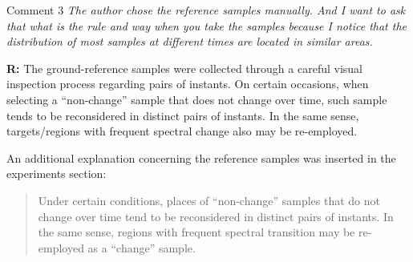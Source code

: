 \documentclass[11pt]{report}
\begin{document}
\medskip
\begin{mybox}{Comment 3}
\textit{The author chose the reference samples manually. And I want to ask that what is the rule and way when you take the samples because I notice that the distribution of most samples at different times are located in similar areas.}

\medskip

\textbf{R:} The ground-reference samples were collected through a careful visual inspection process regarding pairs of instants. On certain occasions, when selecting a ``non-change'' sample that does not change over time, such sample tends to be reconsidered in distinct pairs of instants. In the same sense, targets/regions with frequent spectral change also may be re-employed.

\medskip


An additional explanation concerning the reference samples was inserted in the experiments section:
\begin{quotation}

Under certain conditions, places of ``non-change'' samples that do not change over time tend to be reconsidered in distinct pairs of instants. In the same sense, regions with frequent spectral transition may be re-employed as a ``change'' sample.

\end{quotation}


\end{mybox}

\vspace{0.3cm}
\end{document}
